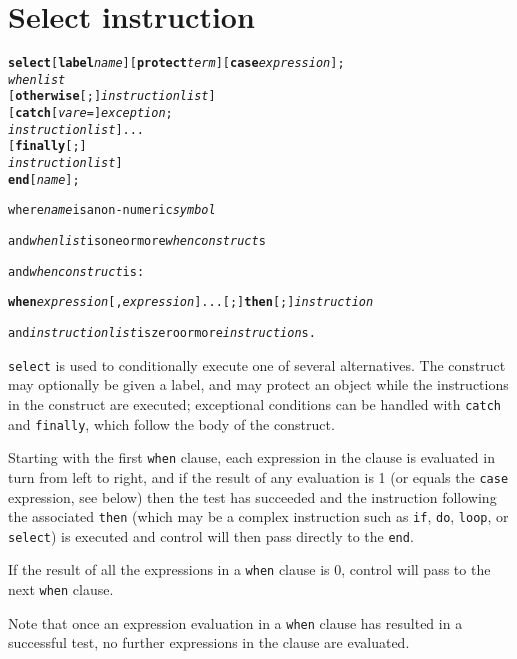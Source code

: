\chapter{Select instruction}
\index{,}
\index{,}
\index{,}
\index{,}
\begin{shaded}
\begin{alltt}
\textbf{select} [\textbf{label} \emph{name}] [\textbf{protect} \emph{term}] [\textbf{case} \emph{expression}];
        \emph{whenlist}
        [\textbf{otherwise}[;] \emph{instructionlist}]
    [\textbf{catch} [\emph{vare} =] \emph{exception};
        \emph{instructionlist}]...
    [\textbf{finally}[;]
        \emph{instructionlist}]
    \textbf{end} [\emph{name}];

where \emph{name} is a non-numeric \emph{symbol}

and \emph{whenlist} is one or more \emph{whenconstruct}s

and \emph{whenconstruct} is:

    \textbf{when} \emph{expression}[, \emph{expression}]... [;] \textbf{then}[;] \emph{instruction}

and \emph{instructionlist} is zero or more \emph{instruction}s.
\end{alltt}
\end{shaded}
 \texttt{select} is used to conditionally execute one of several
alternatives.
The construct may optionally be given a label, and may protect an object
while the instructions in the construct are executed; exceptional
conditions can be handled with \texttt{catch} and \texttt{finally},
which follow the body of the construct.
 
Starting with the first \texttt{when} clause, each expression in
the clause is evaluated in turn from left to right, and if the
result of any evaluation is 1 (or equals the \texttt{case}
expression, see below) then the test has succeeded and the
instruction following the associated \texttt{then} (which may be
a complex instruction such as \texttt{if}, \texttt{do},
\texttt{loop}, or \texttt{select}) is executed and control will
then pass directly to the \texttt{end}.
 
If the result of all the expressions in a \texttt{when} clause
is 0, control will pass to the next \texttt{when} clause.
 
Note that once an expression evaluation in a \texttt{when}
clause has resulted in a successful test, no further expressions
in the clause are evaluated.
 
